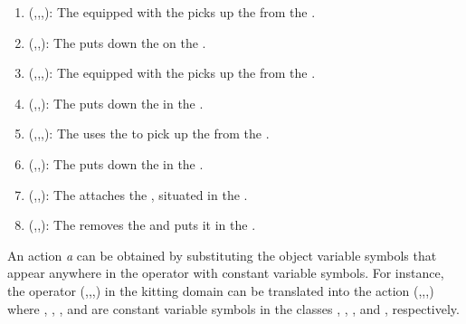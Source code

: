 \begin{enumerate}
\item {}(,,,): The   equipped with the   picks up the   from the  .

\item {}(,,): The   puts down the   on the  .

\item {}(,,,): The   equipped with the   picks up the   from the  .

\item {}(,,): The   puts down the   in the  .

\item {}(,,,): The   uses the   to pick up the   from the  .

\item {}(,,): The   puts down the   in the  .

\item {}(,,): The   attaches the  , situated in the  .

\item {}(,,): The   removes the   and puts it in the  .
\end{enumerate}

An action \textit{a} can be obtained by substituting the object variable symbols that
appear anywhere in the operator with constant variable symbols. For instance, the operator (,,,) in the kitting domain can be translated into the action (,,,) where , , , and  are constant variable symbols in the classes , , , and , respectively.
